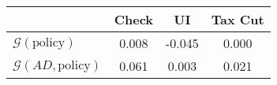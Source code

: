 \begin{tabular}{@{}lccc@{}} 
\toprule 
                          & Check      & UI    & Tax Cut    \\  \midrule 
$\mathcal{G}(\text{policy})$ & 0.008  & -0.045  & 0.000     \\ 
$\mathcal{G}(AD,\text{policy})$ & 0.061  & 0.003  & 0.021     \\ 
\end{tabular}  
